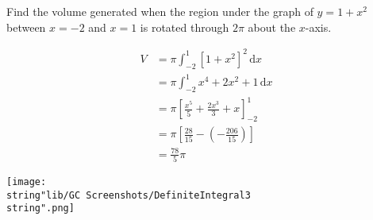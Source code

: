 \documentclass[11pt,a4paper]{book}
\begin{document}
\begin{example}

Find the volume generated when the region under the graph of $y=1+x^{2}$ between $x=-2$ and $x=1$ is rotated through $2\pi$ about the $x$-axis.

\Solution

\begin{minipage}[t]{0.5\textwidth}

\begin{align*}
V & =\pi\int_{-2}^{1}\left[1+x^{2}\right]^{2}\,\mathrm{d}x\\
 & =\pi\int_{-2}^{1}x^{4}+2x^{2}+1\,\mathrm{d}x\\
 & =\pi\left[\frac{x^{5}}{5}+\frac{2x^{3}}{3}+x\right]_{-2}^{1}\\
 & =\pi\left[\frac{28}{15}-\left(-\frac{206}{15}\right)\right]\\
 & =\frac{78}{5}\pi
\end{align*}

\end{minipage}
\begin{minipage}[t]{0.5\textwidth}

\begin{center}
\texttt{[image: \\string"lib/GC Screenshots/DefiniteIntegral3\\string".png]}
\par\end{center}

\end{minipage}

\end{example}
\end{document}
